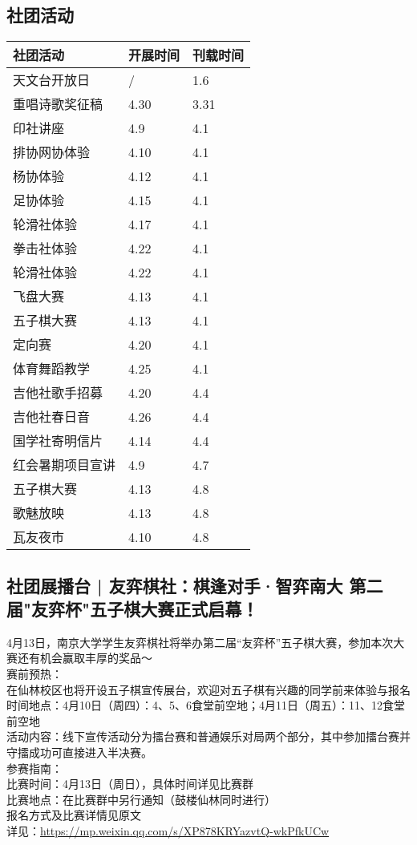 \documentclass[letterpaper, 12pt]{article}
\begin{document}
\begin{multicols}{2}
\section{社团活动}
\begin{tabular}{|>{\centering\arraybackslash}m{}|m{}|m{}|}
    \hline
    社团活动 & 开展时间 & 刊载时间\\
    \hline\hline
    天文台开放日 & / & 1.6\\
    重唱诗歌奖征稿 & 4.30 & 3.31\\
    印社讲座 & 4.9 & 4.1\\
    排协网协体验 & 4.10 & 4.1\\
    杨协体验 & 4.12 & 4.1\\
    足协体验 & 4.15 & 4.1\\
    轮滑社体验 & 4.17 & 4.1\\
    拳击社体验 & 4.22 & 4.1\\
    轮滑社体验 & 4.22 & 4.1\\
    飞盘大赛 & 4.13 & 4.1\\
    五子棋大赛 & 4.13 & 4.1\\
    定向赛 & 4.20 & 4.1\\
    体育舞蹈教学 & 4.25 & 4.1\\
    吉他社歌手招募 & 4.20 & 4.4\\
    吉他社春日音 & 4.26 & 4.4\\
    国学社寄明信片 & 4.14 & 4.4\\
    红会暑期项目宣讲 & 4.9 & 4.7\\
    五子棋大赛 & 4.13 & 4.8\\
    歌魅放映 & 4.13 & 4.8\\
    瓦友夜市 & 4.10 & 4.8\\
    \hline
\end{tabular}
\subsection{社团展播台 | 友弈棋社：棋逢对手·智弈南大 第二届"友弈杯"五子棋大赛正式启幕！}
4月13日，南京大学学生友弈棋社将举办第二届“友弈杯”五子棋大赛，参加本次大赛还有机会赢取丰厚的奖品～
\\赛前预热：
\\在仙林校区也将开设五子棋宣传展台，欢迎对五子棋有兴趣的同学前来体验与报名
\\时间地点：4月10日（周四）：4、5、6食堂前空地；4月11日（周五）：11、12食堂前空地
\\活动内容：线下宣传活动分为擂台赛和普通娱乐对局两个部分，其中参加擂台赛并守擂成功可直接进入半决赛。
\\参赛指南：
\\比赛时间：4月13日（周日），具体时间详见比赛群
\\比赛地点：在比赛群中另行通知（鼓楼仙林同时进行）
\\报名方式及比赛详情见原文
\\详见：\url{https://mp.weixin.qq.com/s/XP878KRYazvtQ-wkPfkUCw}


\end{multicols}
\end{document}
